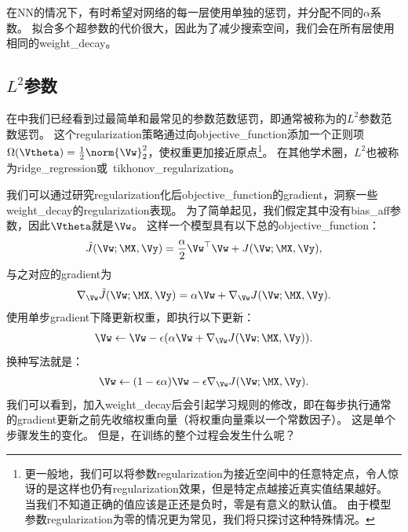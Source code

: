 在\gls{NN}的情况下，有时希望对网络的每一层使用单独的惩罚，并分配不同的$\alpha$系数。
拟合多个超参数的代价很大，因此为了减少搜索空间，我们会在所有层使用相同的\gls{weight_decay}。


\subsection{$L^2$参数}
\label{sec:l2_parameter_regularization}
在中我们已经看到过最简单和最常见的参数范数惩罚，即通常被称为的$L^2$参数范数惩罚。
这个\gls{regularization}策略通过向\gls{objective_function}添加一个正则项$\Omega(\Vtheta) = \frac{1}{2} \norm{\Vw}_2^2$，使权重更加接近原点\footnote{更一般地，我们可以将参数\gls{regularization}为接近空间中的任意特定点，令人惊讶的是这样也仍有\gls{regularization}效果，但是特定点越接近真实值结果越好。
当我们不知道正确的值应该是正还是负时，零是有意义的默认值。
由于模型参数\gls{regularization}为零的情况更为常见，我们将只探讨这种特殊情况。}。
在其他学术圈，$L^2$也被称为\gls{ridge_regression}或~\gls{tikhonov_regularization}。

我们可以通过研究\gls{regularization}化后\gls{objective_function}的\gls{gradient}，洞察一些\gls{weight_decay}的\gls{regularization}表现。
为了简单起见，我们假定其中没有\gls{bias_aff}参数，因此$\Vtheta$就是$\Vw$。
这样一个模型具有以下总的\gls{objective_function}：
\begin{align}
  \tilde{J}(\Vw;\MX, \Vy) =\frac{\alpha}{2} \Vw^\top \Vw +  J(\Vw;\MX, \Vy),
\end{align}
与之对应的\gls{gradient}为
\begin{align}
 \nabla_{\Vw} \tilde{J}(\Vw;\MX,\Vy) =\alpha \Vw +  \nabla_{\Vw} J(\Vw;\MX, \Vy).
\end{align}
使用单步\gls{gradient}下降更新权重，即执行以下更新：
\begin{align}
 \Vw \leftarrow \Vw - \epsilon(\alpha \Vw + \nabla_{\Vw} J(\Vw;\MX, \Vy)).
\end{align}
换种写法就是：
\begin{align}
 \Vw \leftarrow (1-\epsilon \alpha)\Vw - \epsilon \nabla_{\Vw} J(\Vw;\MX, \Vy).
\end{align}
我们可以看到，加入\gls{weight_decay}后会引起学习规则的修改，即在每步执行通常的\gls{gradient}更新之前先收缩权重向量（将权重向量乘以一个常数因子）。
这是单个步骤发生的变化。
但是，在训练的整个过程会发生什么呢？


